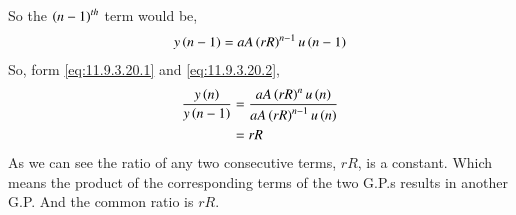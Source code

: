 \documentclass[journal,12pt,twocolumn]{IEEEtran}
\theoremstyle{remark}
\begin{document}
So the $\left(n-1\right)^{th}$ term would be,
\begin{align}
    y\left(n-1\right)=aA\left(rR\right)^{n-1}u\left(n-1\right) \label{eq:11.9.3.20.2}
\end{align}
So, form \ref{eq:11.9.3.20.1} and \ref{eq:11.9.3.20.2},
\begin{align}
    \frac{y\left(n\right)}{y\left(n-1\right)}&=\frac{aA\left(rR\right)^nu\left(n\right)}{aA\left(rR\right)^{n-1}u\left(n\right)} \\
    &=rR
\end{align}
As we can see the ratio of any two consecutive terms, $rR$, is a constant. Which means the product of the corresponding terms of the two G.P.s results in another G.P.
And the common ratio is $rR$.
\end{document}
